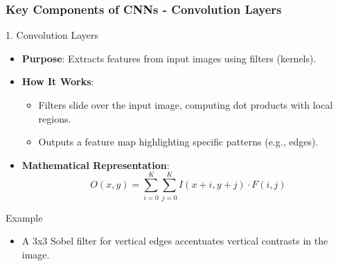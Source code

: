 \documentclass[aspectratio=169]{beamer}
\begin{document}
\begin{frame}[fragile]
    \frametitle{Key Components of CNNs - Convolution Layers}
    \begin{block}{1. Convolution Layers}
        \begin{itemize}
            \item \textbf{Purpose}: Extracts features from input images using filters (kernels).
            \item \textbf{How It Works}:
            \begin{itemize}
                \item Filters slide over the input image, computing dot products with local regions.
                \item Outputs a feature map highlighting specific patterns (e.g., edges).
            \end{itemize}
            \item \textbf{Mathematical Representation}:
            \begin{equation}
                O(x, y) = \sum_{i=0}^{K} \sum_{j=0}^{K} I(x+i, y+j) \cdot F(i, j)
            \end{equation}
        \end{itemize}
    \end{block}
    \begin{block}{Example}
        \begin{itemize}
            \item A 3x3 Sobel filter for vertical edges accentuates vertical contrasts in the image.
        \end{itemize}
    \end{block}
\end{frame}
\end{document}

